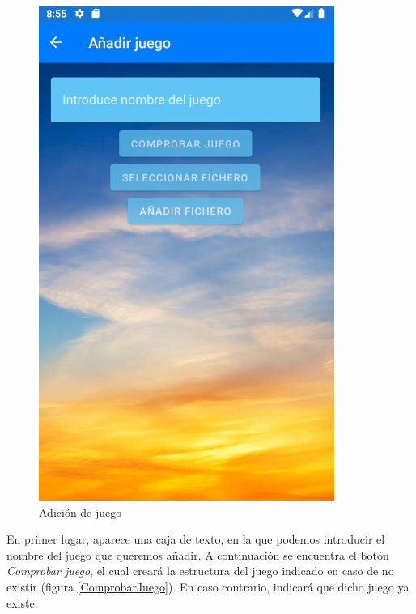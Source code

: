 \begin{figure}[H]
    \centering
    \includegraphics[scale=0.7]{Figures/Capturas/AnadirJuego.png}
    \caption{Adición de juego}
    \label{AnadirJuego}    
\end{figure}

En primer lugar, aparece una caja de texto, en la que podemos introducir el nombre del juego que queremos añadir.
A continuación se encuentra el botón \textit{Comprobar juego}, el cual creará la estructura del juego indicado en caso 
de no existir (figura \ref*{ComprobarJuego}). En caso contrario, indicará que dicho juego ya existe. 

